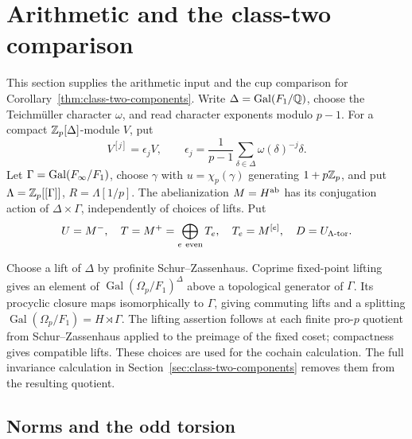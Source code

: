 \section{Arithmetic and the class-two comparison}\label{sec:abelian}

This section supplies the arithmetic input and the cup comparison
for Corollary~\ref{thm:class-two-components}.
Write $\Delta=\operatorname{Gal}(F_1/\mathbb Q)$, choose the Teichm\"uller character
$\omega$, and read character exponents modulo $p-1$.
For a compact $\mathbb Z_p[\Delta]$-module $V$, put
\[
 V^{[j]}=\epsilon_jV,\qquad
 \epsilon_j=\frac1{p-1}\sum_{\delta\in\Delta}\omega(\delta)^{-j}\delta.
\]
Let $\Gamma=\operatorname{Gal}(F_\infty/F_1)$, choose $\gamma$ with
$u=\chi_p(\gamma)$ generating $1+p\mathbb Z_p$, and put
$\Lambda=\mathbb Z_p[[\Gamma]]$, $R=\Lambda[1/p]$.
The abelianization $M=H^{\rm ab}$ has its conjugation action of
$\Delta\times\Gamma$, independently of choices of lifts. Put
\[
 U=M^-,\quad T=M^+=\bigoplus_{e\ {\rm even}}T_e,\quad
 T_e=M^{[e]},\quad D=U_{\Lambda\text{-tor}}.
\]

Choose a lift of $\Delta$ by profinite Schur--Zassenhaus.
Coprime fixed-point lifting gives an element of
$\operatorname{Gal}(\Omega_p/F_1)^\Delta$ above a topological
generator of $\Gamma$. Its procyclic closure maps isomorphically
to $\Gamma$, giving commuting lifts and a splitting
$\operatorname{Gal}(\Omega_p/F_1)=H\rtimes\Gamma$.
The lifting assertion follows at each finite pro-$p$ quotient
from Schur--Zassenhaus applied to the preimage of the fixed
coset; compactness gives compatible lifts. These choices are
used for the cochain calculation. The full invariance calculation
in Section~\ref{sec:class-two-components} removes them from the
resulting quotient.

\subsection{Norms and the odd torsion}

